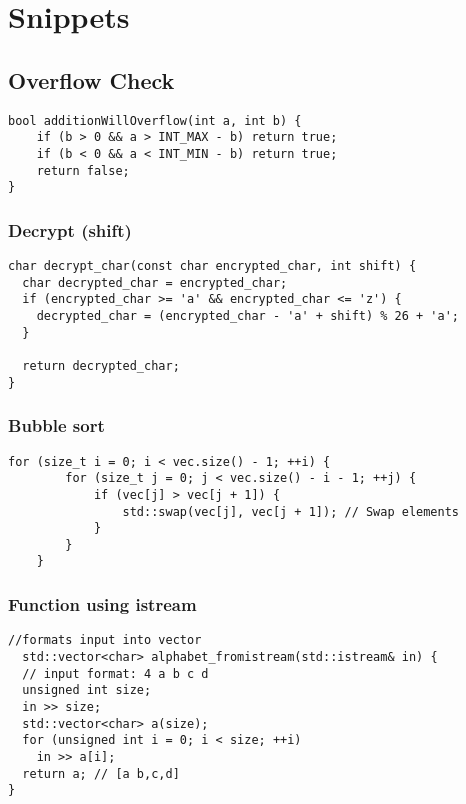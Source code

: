 


\section{Snippets}





\subsection{Overflow Check}

\begin{lstlisting}[style = codeexpert]
bool additionWillOverflow(int a, int b) {
    if (b > 0 && a > INT_MAX - b) return true;
    if (b < 0 && a < INT_MIN - b) return true;
    return false;
}
\end{lstlisting}






\subsubsection{Decrypt (shift)}


\begin{lstlisting}[style = codeexpert]
char decrypt_char(const char encrypted_char, int shift) {
  char decrypted_char = encrypted_char;
  if (encrypted_char >= 'a' && encrypted_char <= 'z') {
    decrypted_char = (encrypted_char - 'a' + shift) % 26 + 'a';
  }

  return decrypted_char;
}
\end{lstlisting}

\subsubsection{Bubble sort}
\begin{lstlisting}[style = codeexpert]
    for (size_t i = 0; i < vec.size() - 1; ++i) {
        for (size_t j = 0; j < vec.size() - i - 1; ++j) {
            if (vec[j] > vec[j + 1]) {
                std::swap(vec[j], vec[j + 1]); // Swap elements
            }
        }
    }
\end{lstlisting}

\subsubsection{Function using istream}
\begin{lstlisting}[style = codeexpert]
//formats input into vector
  std::vector<char> alphabet_fromistream(std::istream& in) {
  // input format: 4 a b c d 
  unsigned int size;
  in >> size;
  std::vector<char> a(size);
  for (unsigned int i = 0; i < size; ++i)
    in >> a[i];
  return a; // [a b,c,d]
}
\end{lstlisting}

